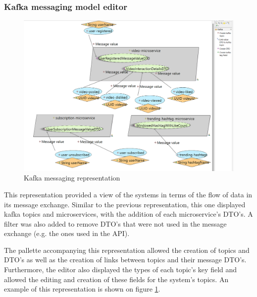 \documentclass[parskip=full]{article}
\begin{document}
    \subsubsection{Kafka messaging model editor}
    \begin{figure}
        \vspace{-3em}
        \includegraphics[height=0.2\paperheight]{messaging-overview-with-pallette}
        \caption{Kafka messaging representation}
        \label{fig:kafkaMessagingEditor}
        \vspace{-3em}
    \end{figure}
    This representation provided a view of the systems in terms of the flow of data in its message exchange.
    Similar to the previous representation, this one displayed kafka topics and microservices, with the addition of each microservice's DTO's.
    A filter was also added to remove DTO's that were not used in the message exchange (e.g. the ones used in the API).

    The pallette accompanying this representation allowed the creation of topics and DTO's as well as the creation of links between topics and their message DTO's.
    Furthermore, the editor also displayed the types of each topic's key field and allowed the editing and creation of these fields for the system's topics.
    An example of this representation is shown on figure \ref{fig:kafkaMessagingEditor}.
\end{document}
